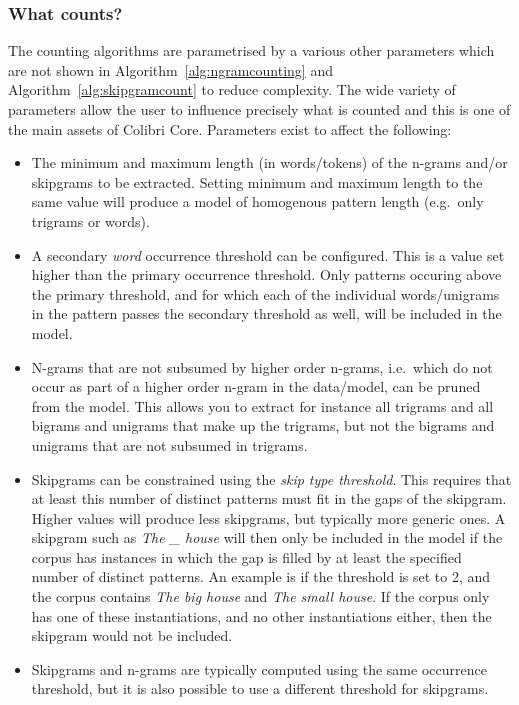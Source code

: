 \documentclass[a4paper,12pt]{article}
\begin{document}
\subsubsection{What counts?}
\label{sec:whatcounts}

The counting algorithms are parametrised by a various other parameters which
are not shown in Algorithm~\ref{alg:ngramcounting} and
Algorithm~\ref{alg:skipgramcount} to reduce complexity. The wide variety of
parameters allow the user to influence precisely what is counted and this is one
of the main assets of Colibri Core. Parameters exist to affect the following:

\begin{itemize}
    \item The minimum and maximum length (in words/tokens) of the n-grams
        and/or skipgrams to be extracted. Setting minimum and maximum length to
        the same value will produce a model of homogenous pattern length
        (e.g.\ only trigrams or words).
    \item A secondary \emph{word} occurrence threshold can be configured. This is a value set higher than
        the primary occurrence threshold. Only patterns
        occuring above the primary threshold, and for which each of the
        individual words/unigrams in the pattern passes the secondary threshold as well, will
        be included in the model.
    \item N-grams that are not subsumed by higher order n-grams, i.e.\ which do
        not  occur as part of a higher order n-gram in the data/model, can be pruned
        from the model. This allows you to extract for instance all trigrams
        and all bigrams and unigrams that make up the trigrams, but not the
        bigrams and unigrams that are not subsumed in trigrams. 
    \item Skipgrams can be constrained using the \emph{skip type threshold}. This
        requires that at least this number of distinct patterns must fit in the
        gaps of the skipgram. Higher values will produce less skipgrams, but
        typically more generic ones. A skipgram such as \emph{The \_ house} will
        then only be included in the model if the corpus has instances in which the gap is
        filled by at least the specified number of distinct patterns. 
        An example is if the threshold is set to 2, and the corpus contains \emph{The
        big house} and \emph{The small house}. If the corpus  only has
        one of these instantiations, and no other instantiations either, then the skipgram would not be included.
    \item Skipgrams and n-grams are typically computed using the same
        occurrence threshold, but it is also possible to use a different threshold
        for skipgrams.
\end{itemize}
\end{document}
